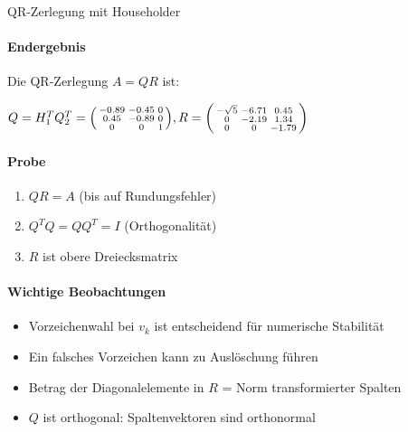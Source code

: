 \begin{example2}[breakable]{QR-Zerlegung mit Householder}
\paragraph{Endergebnis}
Die QR-Zerlegung $A = QR$ ist:

$Q = H_1^TQ_2^T = \begin{psmallmatrix}
-0.89 & -0.45 & 0\\
0.45 & -0.89 & 0\\
0 & 0 & 1
\end{psmallmatrix},
R = \begin{psmallmatrix}
-\sqrt{5} & -6.71 & 0.45\\
0 & -2.19 & 1.34\\
0 & 0 & -1.79
\end{psmallmatrix}$

\paragraph{Probe}
\begin{enumerate}
    \item $QR = A$ (bis auf Rundungsfehler)
    \item $Q^TQ = QQ^T = I$ (Orthogonalität)
    \item $R$ ist obere Dreiecksmatrix
\end{enumerate}

\paragraph{Wichtige Beobachtungen}
\small
\begin{itemize}
    \item Vorzeichenwahl bei $v_k$ ist entscheidend für numerische Stabilität
    \item Ein falsches Vorzeichen kann zu Auslöschung führen
    \item Betrag der Diagonalelemente in $R$ = Norm transformierter Spalten
    \item $Q$ ist orthogonal: Spaltenvektoren sind orthonormal
\end{itemize}
\end{example2}

